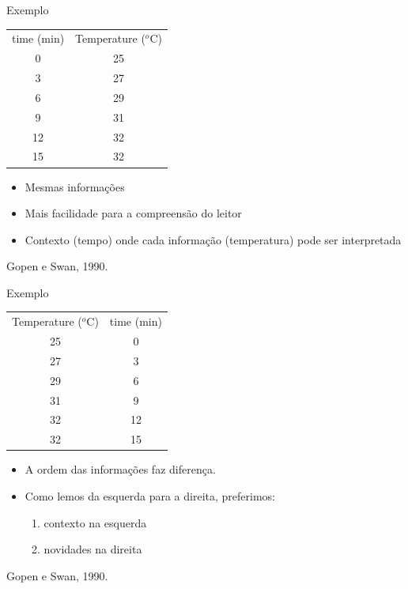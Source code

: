 \documentclass{beamer}
\begin{document}
\begin{frame}{Exemplo}
  \begin{example}
    \begin{tabular}{cc}
      time (min) & Temperature ($^o$C) \\
      0 & 25 \\
      3 & 27 \\
      6 & 29 \\
      9 & 31 \\
      12 & 32 \\
      15 & 32 \\
    \end{tabular}
  \end{example}
  \begin{itemize}
  \item<1-> Mesmas informações
  \item Mais facilidade para a compreensão do leitor
  \item \alert{Contexto} (tempo) onde cada \alert{informação}
    (temperatura) pode ser interpretada
  \end{itemize}
\vfill
Gopen e Swan, 1990.
\end{frame}

\begin{frame}{Exemplo}
  \begin{example}
    \begin{tabular}{cc}
      Temperature ($^o$C) & time (min) \\
      25 & 0 \\
      27 & 3 \\
      29 & 6\\
      31 & 9\\
      32 & 12\\
      32 & 15 \\
    \end{tabular}
  \end{example}
  \begin{itemize}
  \item A \alert{ordem} das informações faz diferença.
  \item Como lemos da esquerda para a direita, preferimos:
    \begin{enumerate}
    \item contexto na esquerda
    \item novidades na direita
    \end{enumerate}
  \end{itemize}

  \vfill
Gopen e Swan, 1990.
\end{frame}
\end{document}
